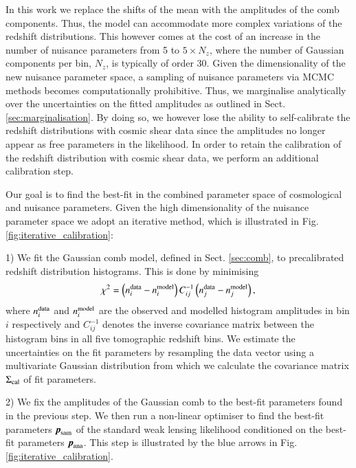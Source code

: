 \documentclass{aa}
\newcommand{\eq}[1]{\begin{equation}  #1 \end{equation}}
\begin{document}
In this work we replace the shifts of the mean with the amplitudes of the comb components. Thus, the model can accommodate more complex variations of the redshift distributions. This however comes at the cost of an increase in the number of nuisance parameters from 5 to $5 \times N_z$, where the number of Gaussian components per bin, $N_z$, is typically of order 30.  Given the dimensionality of the new nuisance parameter space, a sampling of nuisance parameters via MCMC methods becomes computationally prohibitive. Thus, we marginalise analytically over the uncertainties on the fitted amplitudes as outlined in Sect. \ref{sec:marginalisation}. By doing so, we however lose the ability to self-calibrate the redshift distributions with cosmic shear data since the amplitudes no longer appear as free parameters in the likelihood. In order to retain the calibration of the redshift distribution with cosmic shear data, we perform an additional calibration step.

Our goal is to find the best-fit in the combined parameter space of cosmological and nuisance parameters. Given the high dimensionality of the nuisance parameter space we adopt an iterative method, which is illustrated in Fig. \ref{fig:iterative_calibration}:

1) We fit the Gaussian comb model, defined in Sect. \ref{sec:comb}, to precalibrated redshift distribution histograms. This is done by minimising 
\eq{
\chi^2 = \left(n^{\rm data}_i - n^{\rm model}_i\right) C^{-1}_{ij} \left(n^{\rm data}_j - n^{\rm model}_j\right),
} 
where $n^{\rm data}_i$ and $n^{\rm model}_i$ are the observed and modelled histogram amplitudes in bin $i$ respectively and $C^{-1}_{ij}$ denotes the inverse covariance matrix between the histogram bins in all five tomographic redshift bins. We estimate the uncertainties on the fit parameters by resampling the data vector using a multivariate Gaussian distribution from which we calculate the covariance matrix $\Sigma_{\rm cal}$ of fit parameters.

2) We fix the amplitudes of the Gaussian comb to the best-fit parameters found in the previous step. We then run a non-linear optimiser to find the best-fit parameters $\boldsymbol{p}_{\rm sam}$ of the standard weak lensing likelihood conditioned on the best-fit parameters $\boldsymbol{p}_{\rm ana}$. This step is illustrated by the blue arrows in Fig. \ref{fig:iterative_calibration}.
\end{document}
